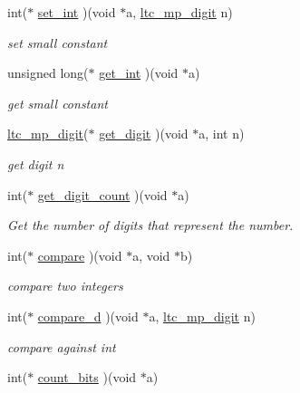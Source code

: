 \begin{DoxyCompactItemize}
int($\ast$ \mbox{\hyperlink{structltc__math__descriptor_ad306f25bb0a78e082f0c3baf85c4f44c}{set\+\_\+int}} )(void $\ast$a, \mbox{\hyperlink{tomcrypt__cfg_8h_a4e98fa26a5de0ac87e06af901bad57c4}{ltc\+\_\+mp\+\_\+digit}} n)
\begin{DoxyCompactList}\small\item\em set small constant \end{DoxyCompactList}\item 
unsigned long($\ast$ \mbox{\hyperlink{structltc__math__descriptor_adc1cbca3af3282460af8ff4ac4dabdeb}{get\+\_\+int}} )(void $\ast$a)
\begin{DoxyCompactList}\small\item\em get small constant \end{DoxyCompactList}\item 
\mbox{\hyperlink{tomcrypt__cfg_8h_a4e98fa26a5de0ac87e06af901bad57c4}{ltc\+\_\+mp\+\_\+digit}}($\ast$ \mbox{\hyperlink{structltc__math__descriptor_adb2107094f3c0aa279a3f12977672a78}{get\+\_\+digit}} )(void $\ast$a, int n)
\begin{DoxyCompactList}\small\item\em get digit n \end{DoxyCompactList}\item 
int($\ast$ \mbox{\hyperlink{structltc__math__descriptor_ae185e44bd77639feb5c360b10bf826ca}{get\+\_\+digit\+\_\+count}} )(void $\ast$a)
\begin{DoxyCompactList}\small\item\em Get the number of digits that represent the number. \end{DoxyCompactList}\item 
int($\ast$ \mbox{\hyperlink{structltc__math__descriptor_afa00530838786ca9b52a21a2c00f0f57}{compare}} )(void $\ast$a, void $\ast$b)
\begin{DoxyCompactList}\small\item\em compare two integers \end{DoxyCompactList}\item 
int($\ast$ \mbox{\hyperlink{structltc__math__descriptor_a5b3038e00644c477282802863619323b}{compare\+\_\+d}} )(void $\ast$a, \mbox{\hyperlink{tomcrypt__cfg_8h_a4e98fa26a5de0ac87e06af901bad57c4}{ltc\+\_\+mp\+\_\+digit}} n)
\begin{DoxyCompactList}\small\item\em compare against int \end{DoxyCompactList}\item 
int($\ast$ \mbox{\hyperlink{structltc__math__descriptor_a8397a978088c5d65413a3d110e9d163f}{count\+\_\+bits}} )(void $\ast$a)

\end{DoxyCompactItemize}
